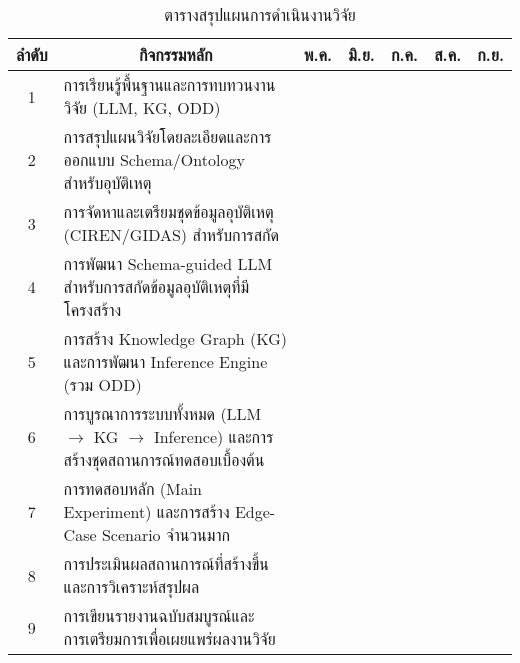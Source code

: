 \begin{table}[h!]
    \centering
    \caption{ตารางสรุปแผนการดำเนินงานวิจัย}
    \label{tab:project-timeline-revised}
\begin{tabular}{|c|p{7cm}|c|c|c|c|c|}
\hline
\multicolumn{1}{|c|}{ลำดับ} & \multicolumn{1}{|c|}{กิจกรรมหลัก} & \multicolumn{1}{|c|}{พ.ค.} & \multicolumn{1}{|c|}{มิ.ย.} & \multicolumn{1}{|c|}{ก.ค.} & \multicolumn{1}{|c|}{ส.ค.} & \multicolumn{1}{|c|}{ก.ย.}\\
\hline
1 & การเรียนรู้พื้นฐานและการทบทวนงานวิจัย (LLM, KG, ODD)
  & \cellcolor{gray!40} & \cellcolor{gray!40} &  &  &  \\
\hline
2 & การสรุปแผนวิจัยโดยละเอียดและการออกแบบ Schema/Ontology สำหรับอุบัติเหตุ
  &  & \cellcolor{gray!40} & \cellcolor{gray!40} &  &  \\
\hline
3 & การจัดหาและเตรียมชุดข้อมูลอุบัติเหตุ (CIREN/GIDAS) สำหรับการสกัด
  &  & \cellcolor{gray!40} & \cellcolor{gray!40} &  &  \\
\hline
4 & การพัฒนา Schema-guided LLM สำหรับการสกัดข้อมูลอุบัติเหตุที่มีโครงสร้าง
  &  &  & \cellcolor{gray!40} & \cellcolor{gray!40} &  \\
\hline
5 & การสร้าง Knowledge Graph (KG) และการพัฒนา Inference Engine (รวม ODD)
  &  &  &  & \cellcolor{gray!40} & \cellcolor{gray!40} \\
\hline
6 & การบูรณาการระบบทั้งหมด (LLM $\rightarrow$ KG $\rightarrow$ Inference) และการสร้างชุดสถานการณ์ทดสอบเบื้องต้น
  &  &  &  & \cellcolor{gray!40} & \cellcolor{gray!40} \\
\hline
7 & การทดสอบหลัก (Main Experiment) และการสร้าง Edge-Case Scenario จำนวนมาก
  &  &  &  &  & \cellcolor{gray!40} \\
\hline
8 & การประเมินผลสถานการณ์ที่สร้างขึ้นและการวิเคราะห์สรุปผล
  &  &  &  &  & \cellcolor{gray!40} \\
\hline
9 & การเขียนรายงานฉบับสมบูรณ์และการเตรียมการเพื่อเผยแพร่ผลงานวิจัย
  &  &  &  & \cellcolor{gray!40} & \cellcolor{gray!40} \\
\hline
\end{tabular}
\end{table}